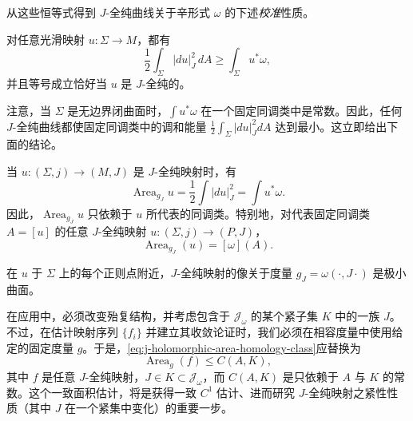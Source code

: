 从这些恒等式得到 $J$-全纯曲线关于辛形式 $\omega$ 的下述\emph{校准}性质。

\begin{corollary}\label{cor:calibrated-energy-inequality}
对任意光滑映射 $u:\Sigma\to M$，都有
\[
 \frac12\int_\Sigma|du|_J^2\,dA\geq\int_\Sigma u^*\omega,
\]
并且等号成立恰好当 $u$ 是 $J$-全纯的。
\end{corollary}

注意，当 $\Sigma$ 是无边界闭曲面时，$\int u^*\omega$ 在一个固定同调类中是常数。因此，任何 $J$-全纯曲线都使固定同调类中的调和能量
$\frac12\int_\Sigma|du|_J^2dA$ 达到最小。这立即给出下面的结论。

\begin{proposition}\label{prop:j-holomorphic-area-homology}
当 $u:(\Sigma,j)\to(M,J)$ 是 $J$-全纯映射时，有
\[
 \operatorname{Area}_{g_J}u
 =\frac12\int|du|_J^2=\int u^*\omega.
\]
因此，$\operatorname{Area}_{g_J}u$ 只依赖于 $u$ 所代表的同调类。特别地，对代表固定同调类 $A=[u]$ 的任意 $J$-全纯映射
$u:(\Sigma,j)\to(P,J)$，
\begin{equation}
 \operatorname{Area}_{g_J}(u)=[\omega](A).
 \label{eq:j-holomorphic-area-homology-class}
\end{equation}
\end{proposition}

\begin{corollary}\label{cor:j-holomorphic-image-minimal-surface}
在 $u$ 于 $\Sigma$ 上的每个正则点附近，$J$-全纯映射的像关于度量
$g_J=\omega(\cdot,J\cdot)$ 是极小曲面。
\end{corollary}

\begin{remark}\label{rem:varying-j-uniform-area-estimate}
在应用中，必须改变殆复结构，并考虑包含于 $\mathcal J_\omega$ 的某个紧子集 $K$ 中的一族 $J$。不过，在估计映射序列 $\{f_i\}$ 并建立其收敛论证时，我们必须在相容度量中使用给定的固定度量 $g$。于是，\eqref{eq:j-holomorphic-area-homology-class}应替换为
\[
 \operatorname{Area}_g(f)\leq C(A,K),
\]
其中 $f$ 是任意 $J$-全纯映射，$J\in K\subset\mathcal J_\omega$，而 $C(A,K)$ 是只依赖于 $A$ 与 $K$ 的常数。这个一致面积估计，将是获得一致 $C^1$ 估计、进而研究 $J$-全纯映射之紧性性质（其中 $J$ 在一个紧集中变化）的重要一步。
\end{remark}
